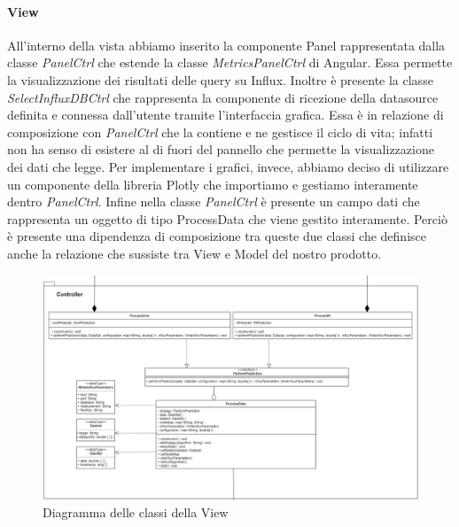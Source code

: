 			\paragraph{View}
			All'interno della vista abbiamo inserito la componente Panel rappresentata dalla classe \textit{PanelCtrl} che estende la classe \textit{MetricsPanelCtrl} di Angular. Essa permette la visualizzazione dei risultati delle query su Influx.
			Inoltre è presente la classe \textit{SelectInfluxDBCtrl} che rappresenta la componente di ricezione della datasource definita e connessa dall'utente tramite l'interfaccia grafica. Essa è in relazione di composizione con \textit{PanelCtrl} che la contiene e ne gestisce il ciclo di vita; infatti non ha senso di esistere al di fuori del pannello che permette la visualizzazione dei dati che legge.
			Per implementare i grafici, invece, abbiamo deciso di utilizzare un componente della libreria Plotly che importiamo e gestiamo interamente dentro \textit{PanelCtrl}.
			Infine nella classe \textit{PanelCtrl} è presente un campo dati che rappresenta un oggetto di tipo ProcessData che viene gestito interamente. Perciò è presente una dipendenza di composizione tra queste due classi che definisce anche la relazione che sussiste tra View e Model del nostro prodotto. 
			\mbox{}
			\begin{figure} [H]
				\includegraphics[width=\linewidth]{./img/Diagrammi/d3.png}
				\caption{Diagramma delle classi della View}
			\end{figure}
